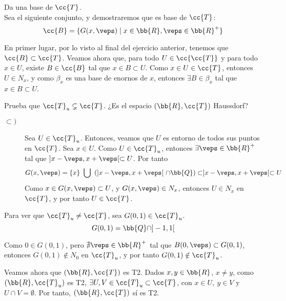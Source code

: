 \documentclass[12pt]{article}
\newcommand{\T}[0]{\cc{T}}
\begin{document}
    \begin{ejercicio}[1 punto]
        Da una base de $\T$.\\

        Sea el siguiente conjunto, y demostraremos que es base de $\T$:
        \begin{equation*}
            \cc{B} = \{G(x,\veps)\mid x\in \bb{R}, \veps\in \bb{R}^+\}
        \end{equation*}

        En primer lugar, por lo visto al final del ejercicio anterior, tenemos que $\cc{B}\subset \T$.
        Veamos ahora que, para todo $U\in \cc{\T}$ y para todo $x\in U$, existe $B\in \cc{B}$ tal que $x\in B\subset U$.
        Como $x\in U\in \T$, entonces $U\in N_x$, y como $\beta_x$ es una base de enornos de $x$, entonces $\exists B\in \beta_x$ tal que $x\in B\subset U$.
    \end{ejercicio}

    \begin{ejercicio}[1 punto]
        Prueba que $\T_u\subsetneq \T$. ¿Es el espacio $(\bb{R},\T)$ Haussdorf?

        \begin{description}
            \item[$\subset)$] Sea $U\in \T_u$. Entonces, veamos que $U$ es entorno de todos sus puntos en $\T$.
            Sea $x\in U$. Como $U\in \T_u$, entonces $\exists \veps\in \bb{R}^+$ tal que $]x-\veps,x+\veps[\subset U$.
            Por tanto
            \begin{equation*}
                G(x,\veps) = \{x\} ~\bigcup~ \left(]x-\veps, x+\veps[~\cap \bb{Q}\right) \subset ]x-\veps,x+\veps[\subset U
            \end{equation*}
            Como $x\in G(x,\veps)\subset U$, y $G(x,\veps)\in N_x$, entonces $U\in N_x$ en $\T$, y por tanto $U\in \T$. 
        \end{description}

        Para ver que $\T_u\neq \T$, sea $G(0,1)\in \T_u$.
        \begin{equation*}
            G(0,1) = \bb{Q}\cap ]-1,1[
        \end{equation*}

        Como $0\in G(0,1)$, pero $\nexists \veps\in \bb{R}^+$ tal que $B(0,\veps)\subset G(0,1)$, entonces $G(0,1)\notin N_0$ en $\T_u$, y por tanto $G(0,1)\notin \T_u$.

        Veamos ahora que $(\bb{R},\T)$ es T2. Dados $x,y\in \bb{R}$, $x\neq y$,
        como $(\bb{R},\T_u)$ es T2, $\exists U,V\in \T_u\subset \T$, con $x\in U,~y\in V$ y $U\cap V=\emptyset$.  
        Por tanto, $(\bb{R},\T)$ sí es T2.
    \end{ejercicio}
\end{document}
